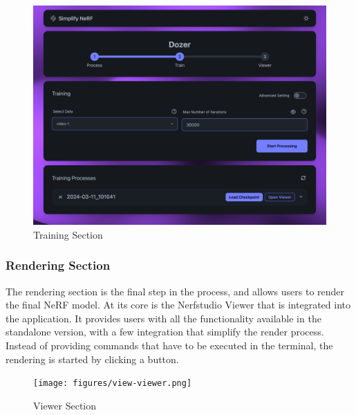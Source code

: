 \begin{figure}[htb]
  \includegraphics[width=\textwidth]{figures/view-train.png}
  \caption{Training Section}
  \label{fig:design:training-section}
\end{figure}

\subsubsection{Rendering Section}

The rendering section is the final step in the process, and allows users to render the final NeRF model.
At its core is the Nerfstudio Viewer that is integrated into the application. 
It provides users with all the functionality available in the standalone version, with a few integration that simplify the render process.
Instead of providing commands that have to be executed in the terminal, the rendering is started by clicking a button.

\begin{figure}[htb]
  \texttt{[image: figures/view-viewer.png]}
  \caption{Viewer Section}
  \label{fig:design:viewer-section}
\end{figure}